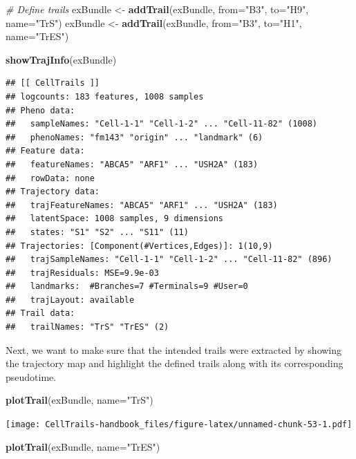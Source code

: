 \documentclass[]{book}
\newenvironment{Shaded}{\begin{snugshade}}{\end{snugshade}}
\newcommand{\KeywordTok}[1]{\textcolor[rgb]{0.13,0.29,0.53}{\textbf{#1}}}
\newcommand{\DataTypeTok}[1]{\textcolor[rgb]{0.13,0.29,0.53}{#1}}
\newcommand{\StringTok}[1]{\textcolor[rgb]{0.31,0.60,0.02}{#1}}
\newcommand{\CommentTok}[1]{\textcolor[rgb]{0.56,0.35,0.01}{\textit{#1}}}
\newcommand{\NormalTok}[1]{#1}
\theoremstyle{definition}
\theoremstyle{definition}
\theoremstyle{definition}
\theoremstyle{remark}
\begin{document}
\begin{Shaded}
\begin{Highlighting}[]
\CommentTok{# Define trails}
\NormalTok{exBundle <-}\StringTok{ }\KeywordTok{addTrail}\NormalTok{(exBundle, }\DataTypeTok{from=}\StringTok{"B3"}\NormalTok{, }\DataTypeTok{to=}\StringTok{"H9"}\NormalTok{, }\DataTypeTok{name=}\StringTok{"TrS"}\NormalTok{)}
\NormalTok{exBundle <-}\StringTok{ }\KeywordTok{addTrail}\NormalTok{(exBundle, }\DataTypeTok{from=}\StringTok{"B3"}\NormalTok{, }\DataTypeTok{to=}\StringTok{"H1"}\NormalTok{, }\DataTypeTok{name=}\StringTok{"TrES"}\NormalTok{)}

\KeywordTok{showTrajInfo}\NormalTok{(exBundle)}
\end{Highlighting}
\end{Shaded}

\begin{verbatim}
## [[ CellTrails ]] 
## logcounts: 183 features, 1008 samples
## Pheno data: 
##   sampleNames: "Cell-1-1" "Cell-1-2" ... "Cell-11-82" (1008)
##   phenoNames: "fm143" "origin" ... "landmark" (6)
## Feature data: 
##   featureNames: "ABCA5" "ARF1" ... "USH2A" (183)
##   rowData: none
## Trajectory data: 
##   trajFeatureNames: "ABCA5" "ARF1" ... "USH2A" (183)
##   latentSpace: 1008 samples, 9 dimensions
##   states: "S1" "S2" ... "S11" (11)
## Trajectories: [Component(#Vertices,Edges)]: 1(10,9)
##   trajSampleNames: "Cell-1-1" "Cell-1-2" ... "Cell-11-82" (896)
##   trajResiduals: MSE=9.9e-03
##   landmarks:  #Branches=7 #Terminals=9 #User=0
##   trajLayout: available
## Trail data: 
##   trailNames: "TrS" "TrES" (2)
\end{verbatim}

Next, we want to make sure that the intended trails were extracted by
showing the trajectory map and highlight the defined trails along with
its corresponding pseudotime.

\begin{Shaded}
\begin{Highlighting}[]
\KeywordTok{plotTrail}\NormalTok{(exBundle, }\DataTypeTok{name=}\StringTok{"TrS"}\NormalTok{)}
\end{Highlighting}
\end{Shaded}

\texttt{[image: CellTrails-handbook\_files/figure-latex/unnamed-chunk-53-1.pdf]}

\begin{Shaded}
\begin{Highlighting}[]
\KeywordTok{plotTrail}\NormalTok{(exBundle, }\DataTypeTok{name=}\StringTok{"TrES"}\NormalTok{)}
\end{Highlighting}
\end{Shaded}
\end{document}
